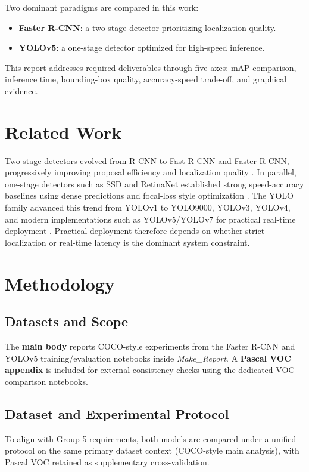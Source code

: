 \documentclass[conference]{IEEEtran}
\begin{document}
Two dominant paradigms are compared in this work:
\begin{itemize}
	\item \textbf{Faster R-CNN}: a two-stage detector prioritizing localization quality.
	\item \textbf{YOLOv5}: a one-stage detector optimized for high-speed inference.
\end{itemize}

This report addresses required deliverables through five axes: mAP comparison, inference time, bounding-box quality, accuracy-speed trade-off, and graphical evidence.

\section{Related Work}
Two-stage detectors evolved from R-CNN to Fast R-CNN and Faster R-CNN, progressively improving proposal efficiency and localization quality \cite{girshick2014rcnn,girshick2015fast,ren2015faster}. In parallel, one-stage detectors such as SSD and RetinaNet established strong speed-accuracy baselines using dense predictions and focal-loss style optimization \cite{liu2016ssd,lin2017focal}. The YOLO family advanced this trend from YOLOv1 to YOLO9000, YOLOv3, YOLOv4, and modern implementations such as YOLOv5/YOLOv7 for practical real-time deployment \cite{redmon2016you,redmon2017yolo9000,redmon2018yolov3,bochkovskiy2020yolov4,yolov5,wang2022yolov7}. Practical deployment therefore depends on whether strict localization or real-time latency is the dominant system constraint.

\section{Methodology}
\subsection{Datasets and Scope}
The \textbf{main body} reports COCO-style experiments from the Faster R-CNN and YOLOv5 training/evaluation notebooks inside \textit{Make\_Report}. A \textbf{Pascal VOC appendix} is included for external consistency checks using the dedicated VOC comparison notebooks.

\subsection{Dataset and Experimental Protocol}
To align with Group 5 requirements, both models are compared under a unified protocol on the same primary dataset context (COCO-style main analysis), with Pascal VOC retained as supplementary cross-validation.
\end{document}
